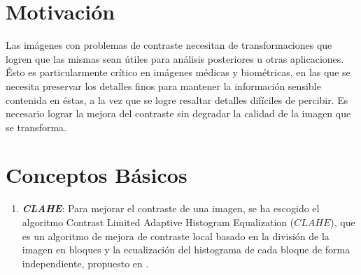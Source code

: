 \documentclass[a0,landscape,spanish]{a0poster}
\begin{document}


\begin{multicols}{3} %


\color{Navy} %



\color{SaddleBrown} %

\section*{Motivación}

Las imágenes con problemas de contraste necesitan de transformaciones que logren que las mismas sean útiles para análisis posteriores u otras aplicaciones. Ésto es particularmente crítico en imágenes médicas y biométricas, en las que se necesita preservar los detalles finos para mantener la información sensible contenida en éstas, a la vez que se logre resaltar detalles difíciles de percibir. Es necesario lograr la mejora del contraste sin degradar la calidad de la imagen que se transforma.
\color{Black} %
\section*{Conceptos Básicos}

\begin{enumerate}
\item{\it \textbf{CLAHE}}: Para mejorar el contraste de una imagen, se ha escogido el algoritmo Contrast Limited Adaptive Histogram Equalization ($CLAHE$), que es un algoritmo de mejora de contraste local basado en la división de la imagen en bloques y la ecualización del histograma de cada bloque de forma independiente, propuesto en \cite{Zuiderveld:1994:CLA:180895.180940}. %



\end{enumerate}
\end{multicols}
\end{document}

